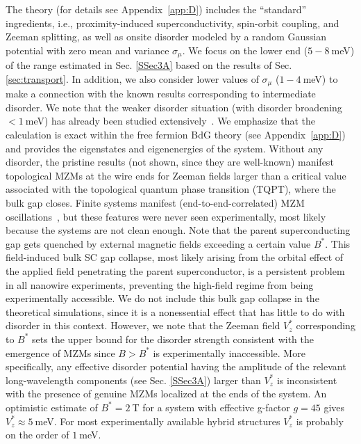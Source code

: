 \documentclass[aps,prmaterials,twocolumn,superscriptaddress,longbibliography]{revtex4-2}
\begin{document}
The theory (for details see Appendix~\ref{app:D}) includes the ``standard'' ingredients, i.e., proximity-induced superconductivity,  spin-orbit coupling, and Zeeman splitting, as well as onsite disorder modeled by a random Gaussian potential with zero mean and variance $\sigma_\mu$. We focus on the lower end ($5-8~$meV) of the range estimated in Sec. \ref{SSec3A} based on the results of Sec. \ref{sec:transport}. In addition, we also consider lower values of $\sigma_\mu$ ($1-4~$meV) to make a connection with the known results corresponding to intermediate disorder. 
We note that the weaker disorder situation (with disorder broadening $ < 1~$meV) has already been studied extensively~\cite{brouwer2011topological,lutchyn2011search,akhmerov2011quantized,sau2012experimental,liu2012zerobias,hui2015bulk,sau2013density,liu2017andreev,haim2019benefits,pan2020physical,pan2021threeterminal,pan2021disorder,dassarma2021disorderinduced}.
We emphasize that the calculation is exact within the free fermion BdG theory (see Appendix~\ref{app:D}) and provides the eigenstates and eigenenergies of the system.  Without any disorder, the pristine results (not shown, since they are well-known) manifest topological MZMs at the wire ends for Zeeman fields larger than a critical value associated with the topological quantum phase transition (TQPT), where the bulk gap closes.  
Finite systems manifest (end-to-end-correlated) MZM oscillations~\cite{dassarma2012splitting}, but these features were never seen experimentally, most likely because the systems are not clean enough. Note that the parent superconducting gap gets quenched by external magnetic fields exceeding a certain value $B^*$. This field-induced bulk SC gap collapse, most likely arising from the orbital effect of the applied field penetrating the parent superconductor, is a persistent problem in all nanowire experiments, preventing the high-field regime from being experimentally accessible. We do not include this bulk gap collapse in the theoretical simulations, since it is a nonessential effect that has little to do with disorder in this context. However, we note that the Zeeman field $V_z^*$ corresponding to $B^*$ sets the upper bound for the disorder strength consistent with the emergence of MZMs since $B>B^*$  is experimentally inaccessible. More specifically, any effective disorder potential having the amplitude of the relevant long-wavelength components (see Sec.  \ref{SSec3A}) larger than $V_z^*$ is inconsistent with the presence of genuine MZMs localized at the ends of the system. An optimistic estimate of $B^*=2~$T for a system with effective g-factor $g=45$ gives $V_z^* \approx 5~$meV. For most experimentally available hybrid structures $V_z^*$ is probably on the order of $1~$meV. 
\end{document}
